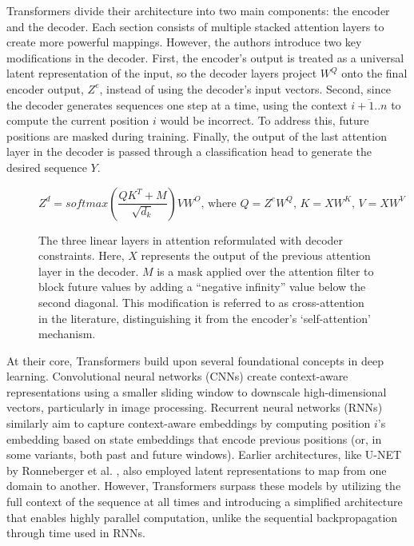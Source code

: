 \vskip 0.2in

Transformers divide their architecture into two main components: the encoder and the decoder. Each section consists of multiple stacked attention layers to create more powerful mappings. However, the authors introduce two key modifications in the decoder. First, the encoder’s output is treated as a universal latent representation of the input, so the decoder layers project $W^Q$ onto the final encoder output, $Z^{e}$, instead of using the decoder’s input vectors. Second, since the decoder generates sequences one step at a time, using the context $\overline{i+1..n}$ to compute the current position $i$ would be incorrect. To address this, future positions are masked during training. Finally, the output of the last attention layer in the decoder is passed through a classification head to generate the desired sequence $Y$.

\begin{figure}[h]
\[ Z^d = softmax(\frac{QK^T + M}{\sqrt{d_k}})VW^O \text{, where } Q = Z^eW^Q\text{, }K = XW^K\text{, } V = XW^V \]
\caption[Decoder Modification in Transformer Architecture]{The three linear layers in attention reformulated with decoder constraints. Here, $X$ represents the output of the previous attention layer in the decoder. $M$ is a mask applied over the attention filter to block future values by adding a “negative infinity” value below the second diagonal. This modification is referred to as cross-attention in the literature, distinguishing it from the encoder’s ‘self-attention’ mechanism.}
\end{figure}

At their core, Transformers build upon several foundational concepts in deep learning. Convolutional neural networks (CNNs) create context-aware representations using a smaller sliding window to downscale high-dimensional vectors, particularly in image processing. Recurrent neural networks (RNNs) similarly aim to capture context-aware embeddings by computing position $i$’s embedding based on state embeddings that encode previous positions (or, in some variants, both past and future windows). Earlier architectures, like U-NET by Ronneberger et al. \cite{ronneberger2015unetconvolutionalnetworksbiomedical}, also employed latent representations to map from one domain to another. However, Transformers surpass these models by utilizing the full context of the sequence at all times and introducing a simplified architecture that enables highly parallel computation, unlike the sequential backpropagation through time used in RNNs.

